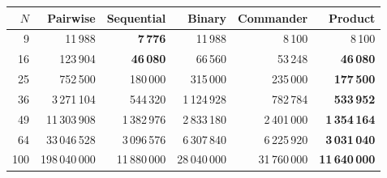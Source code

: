 \begin{tabular}{rrrrrr}
\toprule
$N$ & Pairwise & Sequential & Binary & Commander & Product \\
\midrule
9 & 11\,988 & \textbf{7\,776} & 11\,988 & 8\,100 & 8\,100 \\
16 & 123\,904 & \textbf{46\,080} & 66\,560 & 53\,248 & \textbf{46\,080} \\
25 & 752\,500 & 180\,000 & 315\,000 & 235\,000 & \textbf{177\,500} \\
36 & 3\,271\,104 & 544\,320 & 1\,124\,928 & 782\,784 & \textbf{533\,952} \\
49 & 11\,303\,908 & 1\,382\,976 & 2\,833\,180 & 2\,401\,000 & \textbf{1\,354\,164} \\
64 & 33\,046\,528 & 3\,096\,576 & 6\,307\,840 & 6\,225\,920 & \textbf{3\,031\,040} \\
100 & 198\,040\,000 & 11\,880\,000 & 28\,040\,000 & 31\,760\,000 & \textbf{11\,640\,000} \\
\bottomrule
\end{tabular}
